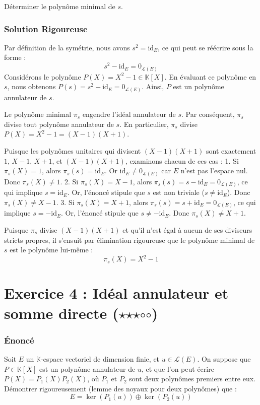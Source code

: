 \documentclass[11pt,a4paper]{article}
\begin{document}
Déterminer le polynôme minimal de $s$.

\section{Solution Rigoureuse}

Par définition de la symétrie, nous avons $s^2 = \text{id}_E$, ce qui peut se réécrire sous la forme :
$$s^2 - \text{id}_E = 0_{\mathcal{L}(E)}$$
Considérons le polynôme $P(X) = X^2 - 1 \in \mathbb{K}[X]$. En évaluant ce polynôme en $s$, nous obtenons $P(s) = s^2 - \text{id}_E = 0_{\mathcal{L}(E)}$.
Ainsi, $P$ est un polynôme annulateur de $s$.

Le polynôme minimal $\pi_s$ engendre l'idéal annulateur de $s$. Par conséquent, $\pi_s$ divise tout polynôme annulateur de $s$. En particulier, $\pi_s$ divise $P(X) = X^2 - 1 = (X - 1)(X + 1)$.

Puisque les polynômes unitaires qui divisent $(X-1)(X+1)$ sont exactement $1$, $X-1$, $X+1$, et $(X-1)(X+1)$, examinons chacun de ces cas :
1. Si $\pi_s(X) = 1$, alors $\pi_s(s) = \text{id}_E$. Or $\text{id}_E \neq 0_{\mathcal{L}(E)}$ car $E$ n'est pas l'espace nul. Donc $\pi_s(X) \neq 1$.
2. Si $\pi_s(X) = X - 1$, alors $\pi_s(s) = s - \text{id}_E = 0_{\mathcal{L}(E)}$, ce qui implique $s = \text{id}_E$. Or, l'énoncé stipule que $s$ est non triviale ($s \neq \text{id}_E$). Donc $\pi_s(X) \neq X - 1$.
3. Si $\pi_s(X) = X + 1$, alors $\pi_s(s) = s + \text{id}_E = 0_{\mathcal{L}(E)}$, ce qui implique $s = -\text{id}_E$. Or, l'énoncé stipule que $s \neq -\text{id}_E$. Donc $\pi_s(X) \neq X + 1$.

Puisque $\pi_s$ divise $(X-1)(X+1)$ et qu'il n'est égal à aucun de ses diviseurs stricts propres, il s'ensuit par élimination rigoureuse que le polynôme minimal de $s$ est le polynôme lui-même :
$$\pi_s(X) = X^2 - 1$$




\part{Exercice 4 : Idéal annulateur et somme directe ($\star$$\star$$\star$$\circ$$\circ$)}

\section{Énoncé}

Soit $E$ un $\mathbb{K}$-espace vectoriel de dimension finie, et $u \in \mathcal{L}(E)$.
On suppose que $P \in \mathbb{K}[X]$ est un polynôme annulateur de $u$, et que l'on peut écrire $P(X) = P_1(X) P_2(X)$, où $P_1$ et $P_2$ sont deux polynômes premiers entre eux.
Démontrer rigoureusement (lemme des noyaux pour deux polynômes) que :
$$E = \ker(P_1(u)) \oplus \ker(P_2(u))$$
\end{document}
